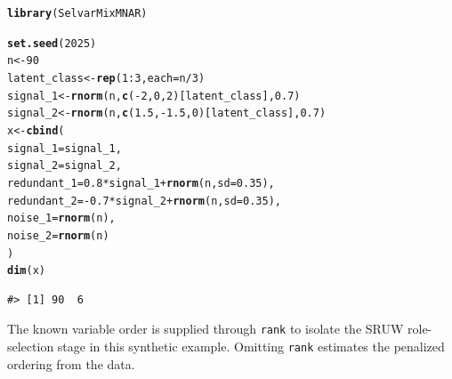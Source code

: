 \documentclass[10pt]{article}\usepackage[]{graphicx}\usepackage[]{xcolor}
\makeatletter
\newcommand{\hlnum}[1]{\textcolor[rgb]{0.686,0.059,0.569}{#1}}%
\newcommand{\hlopt}[1]{\textcolor[rgb]{0,0,0}{#1}}%
\newcommand{\hldef}[1]{\textcolor[rgb]{0.345,0.345,0.345}{#1}}%
\newcommand{\hlkwb}[1]{\textcolor[rgb]{0.69,0.353,0.396}{#1}}%
\newcommand{\hlkwc}[1]{\textcolor[rgb]{0.333,0.667,0.333}{#1}}%
\newcommand{\hlkwd}[1]{\textcolor[rgb]{0.737,0.353,0.396}{\textbf{#1}}}%
\newenvironment{kframe}{%
 \def\at@end@of@kframe{}%
 \ifinner\ifhmode%
  \def\at@end@of@kframe{\end{minipage}}%
  \begin{minipage}{\columnwidth}%
 \fi\fi%
 \def\FrameCommand##1{\hskip\@totalleftmargin \hskip-\fboxsep
 \colorbox{shadecolor}{##1}\hskip-\fboxsep
     \hskip-\linewidth \hskip-\@totalleftmargin \hskip\columnwidth}%
 \MakeFramed {\advance\hsize-\width
   \@totalleftmargin\z@ \linewidth\hsize
   \@setminipage}}%
 {\par\unskip\endMakeFramed%
 \at@end@of@kframe}
\newenvironment{knitrout}{}{} %
\makeatother
\begin{document}
\begin{knitrout}
\color{fgcolor}\begin{kframe}
\begin{alltt}
\hlkwd{library}\hldef{(SelvarMixMNAR)}
\end{alltt}


{\ttfamily\noindent\bfseries\color{errorcolor}{\#> Error in `library()`:\\\#> ! there is no package called 'SelvarMixMNAR'}}\begin{alltt}
\hlkwd{set.seed}\hldef{(}\hlnum{2025}\hldef{)}
\hldef{n} \hlkwb{<-} \hlnum{90}
\hldef{latent_class} \hlkwb{<-} \hlkwd{rep}\hldef{(}\hlnum{1}\hlopt{:}\hlnum{3}\hldef{,} \hlkwc{each} \hldef{= n} \hlopt{/} \hlnum{3}\hldef{)}
\hldef{signal_1} \hlkwb{<-} \hlkwd{rnorm}\hldef{(n,} \hlkwd{c}\hldef{(}\hlopt{-}\hlnum{2}\hldef{,} \hlnum{0}\hldef{,} \hlnum{2}\hldef{)[latent_class],} \hlnum{0.7}\hldef{)}
\hldef{signal_2} \hlkwb{<-} \hlkwd{rnorm}\hldef{(n,} \hlkwd{c}\hldef{(}\hlnum{1.5}\hldef{,} \hlopt{-}\hlnum{1.5}\hldef{,} \hlnum{0}\hldef{)[latent_class],} \hlnum{0.7}\hldef{)}
\hldef{x} \hlkwb{<-} \hlkwd{cbind}\hldef{(}
 \hlkwc{signal_1} \hldef{= signal_1,}
 \hlkwc{signal_2} \hldef{= signal_2,}
 \hlkwc{redundant_1} \hldef{=} \hlnum{0.8} \hlopt{*} \hldef{signal_1} \hlopt{+} \hlkwd{rnorm}\hldef{(n,} \hlkwc{sd} \hldef{=} \hlnum{0.35}\hldef{),}
 \hlkwc{redundant_2} \hldef{=} \hlopt{-}\hlnum{0.7} \hlopt{*} \hldef{signal_2} \hlopt{+} \hlkwd{rnorm}\hldef{(n,} \hlkwc{sd} \hldef{=} \hlnum{0.35}\hldef{),}
 \hlkwc{noise_1} \hldef{=} \hlkwd{rnorm}\hldef{(n),}
 \hlkwc{noise_2} \hldef{=} \hlkwd{rnorm}\hldef{(n)}
\hldef{)}
\hlkwd{dim}\hldef{(x)}
\end{alltt}
\begin{verbatim}
#> [1] 90  6
\end{verbatim}
\end{kframe}
\end{knitrout}

The known variable order is supplied through \texttt{rank} to isolate the SRUW
role-selection stage in this synthetic example. Omitting \texttt{rank}
estimates the penalized ordering from the data.
\end{document}
